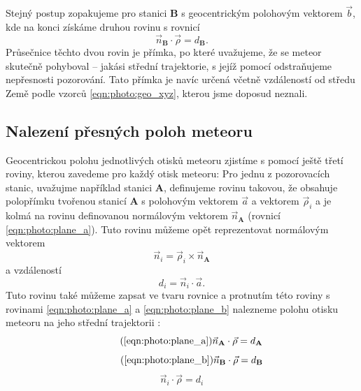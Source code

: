 \medskip

Stejný postup zopakujeme pro stanici \textbf{B} s geocentrickým polohovým vektorem $\vec{b}$, kde na konci získáme druhou rovinu s rovnicí
\begin{equation}
    \vec{n}_\mathbf{B}\cdot \vec{\rho}=d_\mathbf{B}\text{.}
    \label{eqn:photo:plane_b}
\end{equation}
Průsečnice těchto dvou rovin je přímka, po které uvažujeme, že se meteor skutečně pohyboval -- jakási střední trajektorie, s jejíž pomocí odstraňujeme nepřesnosti pozorování. Tato přímka je navíc určená včetně vzdáleností od středu Země podle vzorců \eqref{eqn:photo:geo_xyz}, kterou jsme doposud neznali.

\subsection{Nalezení přesných poloh meteoru}%
Geocentrickou polohu jednotlivých otisků meteoru zjistíme s pomocí ještě třetí roviny, kterou zavedeme pro každý otisk meteoru: Pro jednu z pozorovacích stanic, uvažujme například stanici \textbf{A}, definujeme rovinu takovou, že obsahuje polopřímku tvořenou stanicí \textbf{A} s polohovým vektorem $\vec{a}$ a vektorem $\vec{\rho}_i$ a je kolmá na rovinu definovanou normálovým vektorem $\vec{n}_\mathbf{A}$ (rovnicí \eqref{eqn:photo:plane_a}). Tuto rovinu můžeme opět reprezentovat normálovým vektorem \cite{ceplecha}
\begin{equation}
    \vec{n}_i=\vec{\rho}_i\times\vec{n}_\mathbf{A}
\end{equation}
a vzdáleností
\begin{equation}
    d_i=\vec{n}_i\cdot \vec{a}\text{.}
\end{equation}
Tuto rovinu také můžeme zapsat ve tvaru rovnice a protnutím této roviny s rovinami \eqref{eqn:photo:plane_a} a \eqref{eqn:photo:plane_b} nalezneme polohu otisku meteoru na jeho střední trajektorii \cite{ceplecha}:
\begin{equation}
    \tag{\ref{eqn:photo:plane_a}}
    \vec{n}_\mathbf{A}\cdot\vec{\rho}=d_\mathbf{A}
\end{equation}
\begin{equation}
    \tag{\ref{eqn:photo:plane_b}}
    \vec{n}_\mathbf{B}\cdot\vec{\rho}=d_\mathbf{B}
\end{equation}
\begin{equation}
    \vec{n}_i\cdot\vec{\rho}=d_i
\end{equation}

